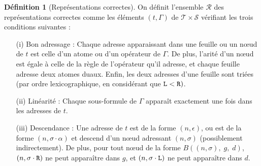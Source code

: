 \documentclass[11pt,a4paper]{article}
\theoremstyle{plain}
\theoremstyle{definition}
\newtheorem{definition}{Définition}
\theoremstyle{remark}
\newcommand*{\sequent}{\Gamma}
\newcommand*{\Left}{\textnormal{\texttt{L}}}
\newcommand*{\Right}{\textnormal{\texttt{R}}}
\newcommand*{\sequents}{\ensuremath{\mathcal{S}}}
\newcommand*{\trees}{\ensuremath{\mathcal{T}}}
\newcommand*{\representationslarge}{\ensuremath{\trees \times \sequents}}
\newcommand*{\representations}{\ensuremath{\mathcal{R}}}
\begin{document}
\begin{definition}[Représentations correctes]
    \label{def_rep}
    On définit l'ensemble \representations{} des représentations correctes comme les éléments $(t, \sequent)$ de $\representationslarge$ vérifiant les trois conditions suivantes :
    
    \begin{itemize}
    \item[(i) Bon adressage :]{ Chaque adresse apparaissant dans une feuille ou un n\oe ud de $t$ est celle d'un atome ou d'un opérateur de $\sequent$. De plus, l'arité d'un n\oe ud est égale à celle de la règle de l'opérateur qu'il adresse, et chaque feuille adresse deux atomes duaux. Enfin, les deux adresses d'une feuille sont triées (par ordre lexicographique, en considérant que $\Left < \Right)$.}
    
    \item[(ii) Linéarité :]{ Chaque sous-formule de $\sequent$ apparaît exactement une fois dans les adresses de $t$.}

    \item[(iii) Descendance :]{ Une adresse de $t$ est de la forme $(n, \epsilon)$, ou est de la forme $(n, \sigma \cdot \alpha)$ et descend d'un n\oe ud adressant $(n, \sigma)$ (possiblement indirectement). De plus, pour tout n\oe ud de la forme $B((n, \sigma), \; g, \; d)$, $(n, \sigma \cdot \Right)$ ne peut apparaître dans $g$, et $(n, \sigma \cdot \Left)$ ne peut apparaître dans $d$.}
    \end{itemize}
\end{definition}
\end{document}
